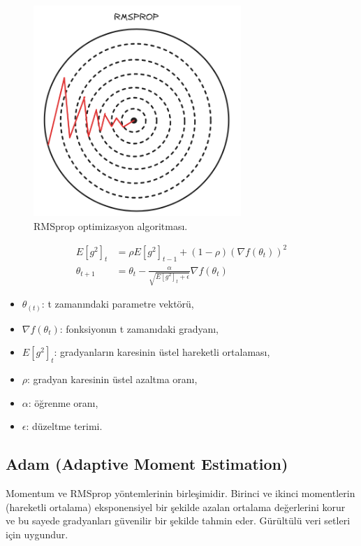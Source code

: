 \begin{figure}[h]
    \centering
    \includegraphics[width=0.7\textwidth]{images/rmsprop_optimizer.png}
    \caption{RMSprop optimizasyon algoritması.}
    \label{fig:enter-label}
\end{figure}

\begin{align*}
E[g^2]_t & = \rho E[g^2]_{t-1} + (1 - \rho) (\nabla f(\theta_t))^2 \\
\theta_{t+1} & = \theta_t - \frac{\alpha}{\sqrt{E[g^2]_t + \epsilon}} \nabla f(\theta_t)
\end{align*}

\begin{itemize}
	\item $\theta_(t)$: t zamanındaki parametre vektörü,
	\item $\nabla f(\theta_{t})$: fonksiyonun t zamanıdaki gradyanı,
	\item $E[g^2]_t$: gradyanların karesinin üstel hareketli ortalaması,
	\item $\rho$: gradyan karesinin üstel azaltma oranı,
	\item $\alpha$: öğrenme oranı,
	\item $\epsilon$: düzeltme terimi.
\end{itemize}

\newpage

\subsection{Adam (Adaptive Moment Estimation)}
Momentum ve RMSprop yöntemlerinin birleşimidir. Birinci ve ikinci momentlerin (hareketli ortalama) eksponensiyel bir şekilde azalan ortalama değerlerini korur ve bu sayede gradyanları güvenilir bir şekilde tahmin eder. Gürültülü veri setleri için uygundur.

